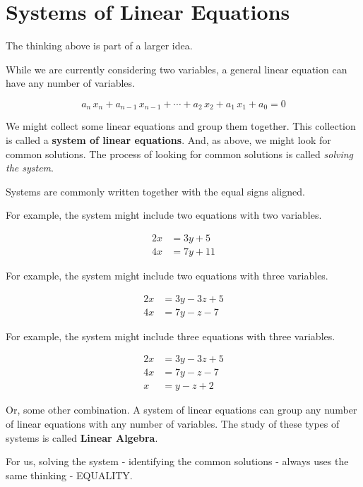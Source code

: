 \documentclass{ximera}
\begin{document}
\section{Systems of Linear Equations}

The thinking above is part of a larger idea.


While we are currently considering two variables, a general linear equation can have any number of variables.


\[
a_n \, x_n + a_{n-1} \, x_{n-1} + \cdots + a_2 \, x_2 + a_1 \, x_1 + a_0 = 0
\]


We might collect some linear equations and group them together. This collection is called a \textbf{system of linear equations}. And, as above, we might look for common solutions.  The process of looking for common solutions is called \textit{solving the system}.





Systems are commonly written together with the equal signs aligned.

For example, the system might include two equations with two variables.

\begin{align*}
2x & = 3y + 5 \\
4x & = 7y + 11
\end{align*}



For example, the system might include two equations with three variables.

\begin{align*}
2x & = 3y - 3z + 5 \\
4x & = 7y - z - 7
\end{align*}




For example, the system might include three equations with three variables.

\begin{align*}
2x & = 3y - 3z + 5 \\
4x & = 7y - z - 7 \\
x & = y - z + 2 
\end{align*}


Or, some other combination. A system of linear equations can group any number of linear equations with any number of variables.  The study of these types of systems is called \textbf{Linear Algebra}.

For us, solving the system - identifying the common solutions - always uses the same thinking - EQUALITY.
\end{document}
